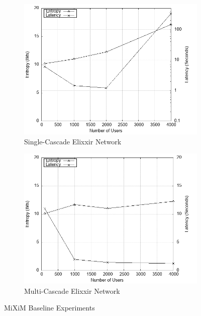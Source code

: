 \documentclass[logo,msc,cyber]{infthesis}   %
\begin{document}
\begin{figure}[h!]
    \centering
    \begin{subfigure}[b]{0.45\textwidth}
        \centering
        \includegraphics[width=\textwidth]{figures/simulator/1_a.png}
        \caption{Single-Cascade Elixxir Network}
        \label{fig:elixxir-cascade}
    \end{subfigure}
    \hfill
    \begin{subfigure}[b]{0.45\textwidth}
        \centering
        \includegraphics[width=\textwidth]{figures/simulator/1_b.png}
        \caption{Multi-Cascade Elixxir Network}
        \label{fig:elixxir-multi-cascade}
    \end{subfigure}
       \caption{MiXiM Baseline Experiments}
       \label{fig:elixxir}
 \end{figure}
\end{document}
